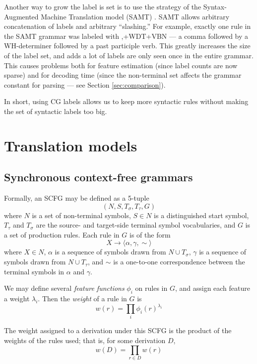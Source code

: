 \documentclass[a4paper]{article}
\begin{document}
Another way to grow the label is set is to use the strategy of the Syntax-Augmented Machine Translation model (SAMT) \cite{samt-wmt06}. SAMT allows arbitrary concatenation of labels and arbitrary ``slashing.'' For example, exactly one rule in the SAMT grammar was labeled with ,+WDT+VBN --- a comma followed by a WH-determiner followed by a past participle verb. This greatly increases the size of the label set, and adds a lot of labels are only seen once in the entire grammar. This causes problems both for feature estimation (since label counts are now sparse) and for decoding time (since the non-terminal set affects the grammar constant for parsing --- see Section \ref{sec:comparison}).

In short, using CG labels allows us to keep more syntactic rules without making the set of syntactic labels too big.

\section{Translation models}

\subsection{Synchronous context-free grammars}

Formally, an SCFG may be defined as a 5-tuple
$$(N,S,T_\sigma,T_\tau,G)$$
where $N$ is a set of non-terminal symbols, $S \in N$ is a distinguished start symbol, $T_\tau$ and $T_\sigma$ are the source- and target-side terminal symbol vocabularies, and $G$ is a set of production rules. Each rule in $G$ is of the form
$$X \to \langle \alpha, \gamma, \sim \rangle$$
where $X \in N$, $\alpha$ is a sequence of symbols drawn from $N \cup T_\sigma$, $\gamma$ is a sequence of symbols drawn from $N \cup T_\tau$, and $\sim$ is a one-to-one correspondence between the terminal symbols in $\alpha$ and $\gamma$.

We may define several {\em feature functions} $\phi_i$ on rules in $G$, and assign each feature a weight $\lambda_i$. Then the {\em weight} of a rule in $G$ is
\begin{equation}
w(r) = \prod_i{\phi_i(r)^{\lambda_i}}
\end{equation}

The weight assigned to a derivation under this SCFG is the product of the weights of the rules used; that is, for some derivation $D$,
\begin{equation}
w(D) = \prod_{r \in D}{w(r)}
\end{equation}
\end{document}
